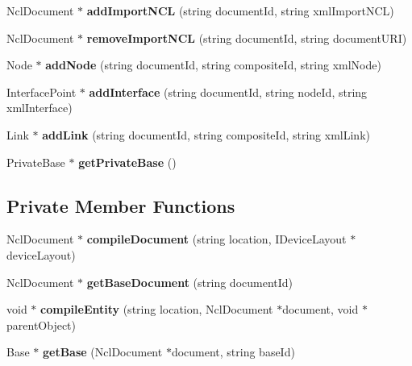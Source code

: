 \begin{CompactItemize}
\item 
NclDocument $\ast$ \textbf{addImportNCL} (string documentId, string xmlImportNCL)\label{classbr_1_1pucrio_1_1telemidia_1_1ginga_1_1ncl_1_1PrivateBaseContext_f01972b80689e1e15035431c74cdc589}

\item 
NclDocument $\ast$ \textbf{removeImportNCL} (string documentId, string documentURI)\label{classbr_1_1pucrio_1_1telemidia_1_1ginga_1_1ncl_1_1PrivateBaseContext_ec83344e580ce947b94398ad67ffc445}

\item 
Node $\ast$ \textbf{addNode} (string documentId, string compositeId, string xmlNode)\label{classbr_1_1pucrio_1_1telemidia_1_1ginga_1_1ncl_1_1PrivateBaseContext_eeb7118e73f86f9e196d4335fd21e6db}

\item 
InterfacePoint $\ast$ \textbf{addInterface} (string documentId, string nodeId, string xmlInterface)\label{classbr_1_1pucrio_1_1telemidia_1_1ginga_1_1ncl_1_1PrivateBaseContext_9712c1fafd77b7c5ee0a29dac44c677d}

\item 
Link $\ast$ \textbf{addLink} (string documentId, string compositeId, string xmlLink)\label{classbr_1_1pucrio_1_1telemidia_1_1ginga_1_1ncl_1_1PrivateBaseContext_a12a5aaa41a65dbf50538494f18a8de9}

\item 
PrivateBase $\ast$ \textbf{getPrivateBase} ()\label{classbr_1_1pucrio_1_1telemidia_1_1ginga_1_1ncl_1_1PrivateBaseContext_a3a82893d9e6a3a9e8431dc66df083f5}

\end{CompactItemize}
\subsection*{Private Member Functions}
\begin{CompactItemize}
\item 
NclDocument $\ast$ \textbf{compileDocument} (string location, IDeviceLayout $\ast$deviceLayout)\label{classbr_1_1pucrio_1_1telemidia_1_1ginga_1_1ncl_1_1PrivateBaseContext_f592b03c21423d78db7d85655cf2a3ec}

\item 
NclDocument $\ast$ \textbf{getBaseDocument} (string documentId)\label{classbr_1_1pucrio_1_1telemidia_1_1ginga_1_1ncl_1_1PrivateBaseContext_d9f6a993e3bca4b0f913818a90681c4c}

\item 
void $\ast$ \textbf{compileEntity} (string location, NclDocument $\ast$document, void $\ast$parentObject)\label{classbr_1_1pucrio_1_1telemidia_1_1ginga_1_1ncl_1_1PrivateBaseContext_eef497c88b5fdc30f78fa95b16b5b06a}

\item 
Base $\ast$ \textbf{getBase} (NclDocument $\ast$document, string baseId)\label{classbr_1_1pucrio_1_1telemidia_1_1ginga_1_1ncl_1_1PrivateBaseContext_82e97727f635b97d4a8b5cd7faf2d7c7}

\end{CompactItemize}
